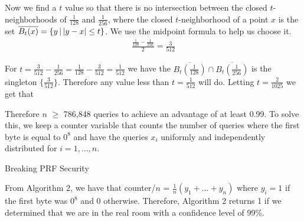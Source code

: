 \documentclass[12pt]{article}
\DeclarePairedDelimiter \abs{\lvert}{\rvert}%
\theoremstyle{remark}
\begin{document}
Now we find a $t$ value so that there is no intersection between the closed $t$-neighborhoods of $\frac{1}{128}$ and $\frac{1}{256}$, where the closed $t$-neighborhood of a point $x$ is the set $\overline{B_t(x)} = \{y \, \vert \, \abs{y-x} \leq t\}$. We use the midpoint formula to help us choose it. 
\begin{align}
\frac{\frac{1}{128}-\frac{1}{256}}{2} = \frac{3}{512}
\end{align}

For $t = \frac{3}{512} - \frac{1}{256} = \frac{1}{128} - \frac{3}{512} = \frac{1}{512}$ we have the $\overline{B_t(\frac{1}{128})} \cap \overline{B_t(\frac{1}{256})}$ is the singleton $\{\frac{3}{512}\}$. Therefore any value less than $t = \frac{1}{512}$ will do. Letting $t = \frac{2}{1025}$ we get that



Therefore $n$ $\geq$ 786,848 queries to achieve an advantage of at least 0.99. To solve this, we keep a counter variable that counts the number of queries where the first byte is equal to $0^8$ and have the queries $x_i$ uniformly and independently distributed for $i = 1, \dots, n$.


\begin{algorithm}[H]
	\caption{Breaking PRF Security}
		\begin{algorithmic}[1]
			\EndIf
			\EndFor
			\Else{}
			\EndIf
		\end{algorithmic}
\end{algorithm}

From Algorithm 2, we have that counter/$n$ = $\frac{1}{n}(y_1 + \dots + y_n)$ where $y_i = 1$ if the first byte was $0^8$ and 0 otherwise. Therefore, Algorithm 2 returns 1 if we determined that we are in the real room with a confidence level of 99\%. 
\end{document}

